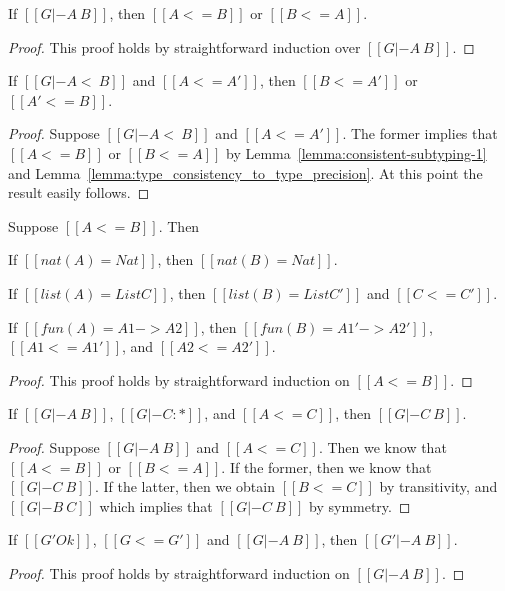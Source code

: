 \begin{lemma}
  \label{lemma:type_consistency_to_type_precision}
  If $[[G |- A ~ B]]$, then $[[A <= B]]$ or $[[B <= A]]$.
\end{lemma}
\begin{proof}
  This proof holds by straightforward induction over $[[G |- A ~ B]]$.
\end{proof}

\begin{lemma}
  \label{lemma:cons_subtype_to_type_pre}
  If $[[G |- A <~ B]]$ and $[[A <= A']]$, then $[[B <= A']]$ or $[[A' <= B]]$.
\end{lemma}
\begin{proof}
  Suppose $[[G |- A <~ B]]$ and $[[A <= A']]$.  The former implies
  that $[[A <= B]]$ or $[[B <= A]]$ by
  Lemma~\ref{lemma:consistent-subtyping-1} and
  Lemma~\ref{lemma:type_consistency_to_type_precision}.  At this
  point the result easily follows.
\end{proof}

\begin{lemma}
  \label{lemma:fun_type_pre}
  Suppose $[[A <= B]]$.  Then
  \begin{enumR}
  \item If $[[nat(A) = Nat]]$, then $[[nat(B) = Nat]]$.    
  \item If $[[list(A) = List C]]$, then $[[list(B) = List C']]$ and $[[C <= C']]$.
  \item If $[[fun(A) = A1 -> A2]]$, then $[[fun(B) = A1' -> A2']]$, $[[A1 <= A1']]$, and $[[A2 <= A2']]$.
  \end{enumR}
\end{lemma}
\begin{proof}
  This proof holds by straightforward induction on $[[A <= B]]$.
\end{proof}

\begin{lemma}
  \label{lemma:type_cons_type_pre_2}
  If $[[G |- A ~ B]]$, $[[G |- C : *]]$, and $[[A <= C]]$, then $[[G |- C ~ B]]$.
\end{lemma}
\begin{proof}
  Suppose $[[G |- A ~ B]]$ and $[[A <= C]]$.  Then we know
  that $[[A <= B]]$ or $[[B <= A]]$.  If the former, then
  we know that $[[G |- C ~ B]]$.  If the latter, then
  we obtain $[[B <= C]]$ by transitivity, and $[[G |- B ~ C]]$
  which implies that $[[G |- C ~ B]]$ by symmetry.
\end{proof}

\begin{lemma}
  \label{lemma:type_cons_ctx_pre}
  If $[[G' Ok]]$, $[[G <= G']]$ and $[[G |- A ~ B]]$, then $[[G' |- A ~ B]]$.
\end{lemma}
\begin{proof}
  This proof holds by straightforward induction on $[[G |- A ~ B]]$. 
\end{proof}

